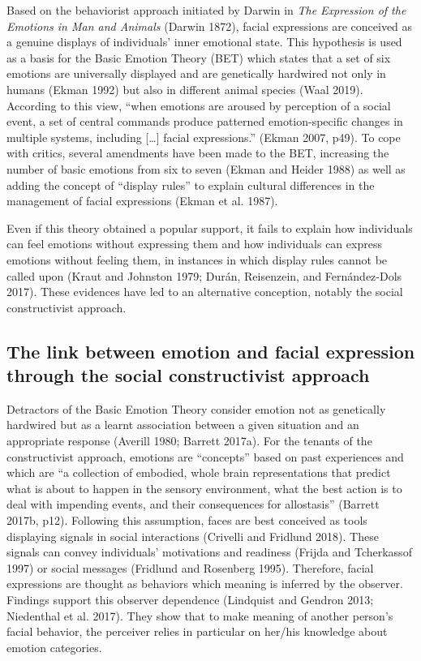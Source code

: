 \documentclass[conference,final,]{IEEEtran}
\begin{document}
Based on the behaviorist approach initiated by Darwin in \emph{The
Expression of the Emotions in Man and Animals} (Darwin 1872), facial
expressions are conceived as a genuine displays of individuals' inner
emotional state. This hypothesis is used as a basis for the Basic
Emotion Theory (BET) which states that a set of six emotions are
universally displayed and are genetically hardwired not only in humans
(Ekman 1992) but also in different animal species (Waal 2019). According
to this view, ``when emotions are aroused by perception of a social
event, a set of central commands produce patterned emotion-specific
changes in multiple systems, including {[}\ldots{}{]} facial
expressions.'' (Ekman 2007, p49). To cope with critics, several
amendments have been made to the BET, increasing the number of basic
emotions from six to seven (Ekman and Heider 1988) as well as adding the
concept of ``display rules'' to explain cultural differences in the
management of facial expressions (Ekman et al. 1987).

Even if this theory obtained a popular support, it fails to explain how
individuals can feel emotions without expressing them and how
individuals can express emotions without feeling them, in instances in
which display rules cannot be called upon (Kraut and Johnston 1979;
Durán, Reisenzein, and Fernández-Dols 2017). These evidences have led to
an alternative conception, notably the social constructivist approach.

\hypertarget{the-link-between-emotion-and-facial-expression-through-the-social-constructivist-approach}{%
\subsection{The link between emotion and facial expression through the
social constructivist
approach}\label{the-link-between-emotion-and-facial-expression-through-the-social-constructivist-approach}}

Detractors of the Basic Emotion Theory consider emotion not as
genetically hardwired but as a learnt association between a given
situation and an appropriate response (Averill 1980; Barrett 2017a). For
the tenants of the constructivist approach, emotions are ``concepts''
based on past experiences and which are ``a collection of embodied,
whole brain representations that predict what is about to happen in the
sensory environment, what the best action is to deal with impending
events, and their consequences for allostasis'' (Barrett 2017b, p12).
Following this assumption, faces are best conceived as tools displaying
signals in social interactions (Crivelli and Fridlund 2018). These
signals can convey individuals' motivations and readiness (Frijda and
Tcherkassof 1997) or social messages (Fridlund and Rosenberg 1995).
Therefore, facial expressions are thought as behaviors which meaning is
inferred by the observer. Findings support this observer dependence
(Lindquist and Gendron 2013; Niedenthal et al. 2017). They show that to
make meaning of another person's facial behavior, the perceiver relies
in particular on her/his knowledge about emotion categories.
\end{document}
